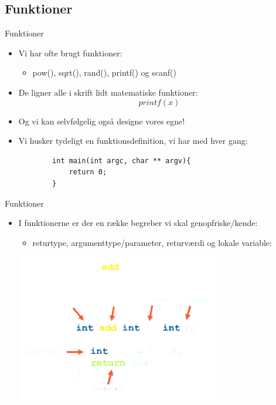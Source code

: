 \documentclass{beamer}
\begin{document}
\subsection{Funktioner}

\begin{frame}[fragile]{Funktioner}
	\begin{itemize}
		\item{Vi har ofte brugt funktioner:}
		\begin{itemize}
			\item{{\color{C_darkblue}pow}(), {\color{C_darkblue}sqrt}(), {\color{C_darkblue}rand}(), {\color{C_darkblue}printf}() og {\color{C_darkblue}scanf}()}
		\end{itemize}
		\item{De ligner alle i skrift lidt matematiske funktioner:}
		\begin{equation}
      	printf(x)
    		\end{equation}
    		\item{Og vi kan selvfølgelig også designe vores egne!}
    		\item{Vi husker tydeligt en funktionsdefinition, vi har med hver gang:}
    		\begin{lstlisting}
		int main(int argc, char ** argv){
			return 0;
		}
		\end{lstlisting}
	\end{itemize}
\end{frame}


\begin{frame}[fragile]{Funktioner}
	\begin{itemize}
		\item{I funktionerne er der en række begreber vi skal genopfriske/kende:}
		\begin{itemize}
			\item{{\color{dkgreen}returtype}, {\color{dkgreen}argumenttype/parameter}, {\color{dkgreen}returværdi} og {\color{dkgreen}lokale variable}:}
		\end{itemize}
	\begin{center}
		\includegraphics[width=0.7\textwidth]{assets/function_description.png}
	\end{center}
	\end{itemize}
\end{frame}
\end{document}
